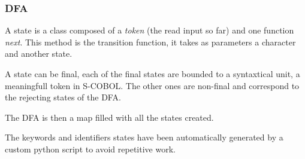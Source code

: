 \subsubsection{DFA}

A state is a class composed of a \textit{token} (the read input so far) and one function \textit{next}. This method is the transition function, it takes as parameters a character and another state.

A state can be final, each of the final states are bounded to a syntaxtical unit, a meaningfull token in S-COBOL. The other ones are non-final and correspond to the rejecting states of the DFA.

The DFA is then a map filled with all the states created.

The keywords and identifiers states have been automatically generated by a custom python script to avoid repetitive work.

